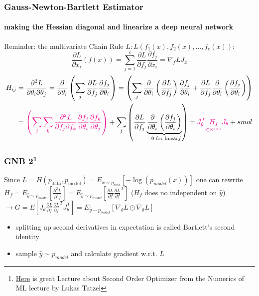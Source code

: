 \documentclass[
	11pt, %
	aspectratio=169, %
]{beamer}
\begin{document}
\begin{frame}
	\frametitle{Gauss-Newton-Bartlett Estimator }
	\framesubtitle{making the Hessian diagonal and linearize a deep neural network}
	Reminder: the multivariate Chain Rule $L: L(f_1(x), f_2(x), \dots, f_c(x))$:\[
\frac{\partial L}{\partial x_i}(f(x)) = \sum_{j=1}^c \frac{\partial L}{\partial f_j} \frac{\partial f_j}{\partial x_i} = \nabla_f L  J_x
\]
				 \begin{align*}
					H_{ij} &= \frac{\partial^2 L}{\partial \theta_i \partial \theta_j} =\frac{\partial}{\partial \theta_i }\left( \sum_j \frac{\partial L}{\partial f_j} \frac{\partial f_j}{\partial \theta_i}  \right) 
				 =\left( \sum_j \frac{\partial}{\partial \theta_i } \left(\frac{\partial L}{\partial f_j}\right) \frac{\partial f_j}{\partial \theta_i} +    \frac{\partial L}{\partial f_j} \frac{\partial}{\partial \theta_i }\left( \frac{\partial f_j}{\partial \theta_i}\right) \right) \\
				 &=\textcolor{magenta}{\left( \sum_j \sum_k \frac{\partial^2 L }{\partial f_j \partial f_k }  \frac{\partial f_j}{\partial \theta_i} \frac{\partial f_k}{\partial \theta_j}\right)}+ \sum_j \left(  \frac{\partial L}{\partial f_j} \underbrace{\frac{\partial}{\partial \theta_i }\left( \frac{\partial f_j}{\partial \theta_i}\right)}_{=0 \text{ for linear}f} \right)  = \textcolor{magenta}{J_\theta^T \underset{\in \mathbb{R}^{c\times c}}{H_f} J_\theta} +  smol
				 \end{align*}
\end{frame}
 
\begin{frame}
	\frametitle{GNB 2\footnote{\href{https://youtu.be/416NjW3QfwA?feature=shared}{Here} is great Lecture about Second Order Optimizer from the Numerics of ML lecture by Lukas Tatzel}}
	Since $L=H(p_{\text{data}}, p_{\text{model}}) = E_{x\sim p_{data}}[-\log(p_{model}(x))]$ one can rewrite  $H_f = E_{\hat{y} \sim p_{model}}[\frac{\partial^2 L }{\partial^2 f }] =E_{\hat{y} \sim p_{model}}[\frac{\partial L }{\partial f }\frac{\partial L }{\partial f }^T] $ ($H_f$ does no independent on $\hat{y}$)\\
	$\rightarrow G = E[J_\theta \frac{\partial L }{\partial f }\frac{\partial L }{\partial f }^T J_\theta^T] = E_{\hat{y} \sim p_{model}}[\nabla_\theta L \odot \nabla_\theta L] $
	\begin{itemize}
		\item splitting up second derivatives in expectation is called Bartlett's second identity 
		\item sample $\hat{y} \sim p_{model}$ and calculate gradient w.r.t. $L$
	\end{itemize}

	
\end{frame}
\end{document}
